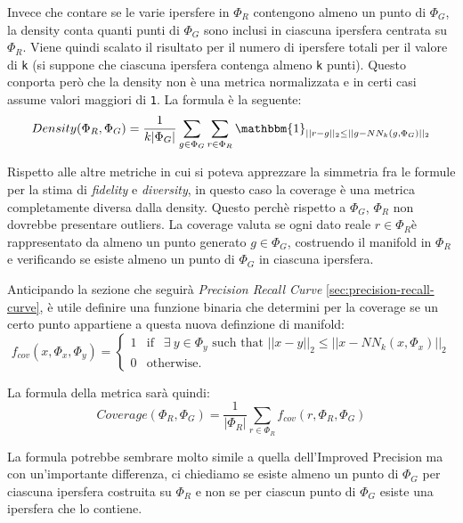 Invece che contare se le varie ipersfere in $\Phi_R$ contengono almeno un punto di $\Phi_G$, la density conta quanti punti di $\Phi_G$ sono inclusi in ciascuna ipersfera centrata su $\Phi_R$. Viene quindi scalato il risultato per il numero di ipersfere totali per il valore di \texttt{k} (si suppone che ciascuna ipersfera contenga almeno \texttt{k} punti).
Questo conporta però che la density non è una metrica normalizzata e in certi casi assume valori maggiori di \texttt{1}. La formula è la seguente: 
\begin{equation}
    Density(\Phi_R, \Phi_G) = \frac{1}{k|\Phi_G|} \sum_{g \in \Phi_G} \sum_{r \in \Phi_R} \mathbbm{1}_{||r - g||_2 \leq ||g - NN_k(g, \Phi_G)||_2}
\end{equation}

Rispetto alle altre metriche in cui si poteva apprezzare la simmetria fra le formule per la stima di \textit{fidelity} e \textit{diversity}, in questo caso la coverage è una metrica completamente diversa dalla density. Questo perchè rispetto a $\Phi_G$, $\Phi_R$ non dovrebbe presentare outliers.
La coverage valuta se ogni dato reale \(r \in \Phi_R \)​ è rappresentato da almeno un punto generato \(g \in \Phi_G \)​, costruendo il manifold in \(\Phi_R\) e verificando se esiste almeno un punto di \(\Phi_G\) in ciascuna ipersfera. 

Anticipando la sezione che seguirà \textit{Precision Recall Curve} \ref{sec:precision-recall-curve}, è utile definire una funzione binaria che determini per la coverage se un certo punto appartiene a questa nuova definzione di manifold:
\begin{equation}
    \label{eq:f-cov}
    f_{cov}(x, \Phi_x, \Phi_y) = 
    \begin{cases}
        1 & \text{if }~~ \exists ~ y \in \Phi_y \text{ such that } ||x - y||_2 \leq ||x - NN_k(x, \Phi_x)||_2 \\
        0 & \text{otherwise.}
    \end{cases}
\end{equation}

La formula della metrica sarà quindi:
\begin{equation}
    Coverage(\Phi_R, \Phi_G) = \frac{1}{|\Phi_R|} \sum_{r \in \Phi_R} f_{cov}(r, \Phi_R, \Phi_G)
\end{equation}

La formula potrebbe sembrare molto simile a quella dell'Improved Precision ma con un'importante differenza, ci chiediamo se esiste almeno un punto di $\Phi_G$ per ciascuna ipersfera costruita su $\Phi_R$ e non se per ciascun punto di $\Phi_G$ esiste una ipersfera che lo contiene. 

